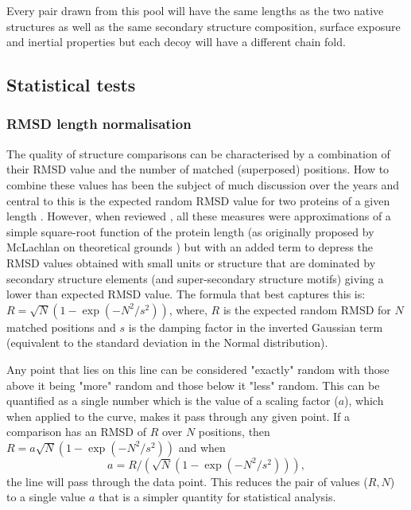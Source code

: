Every pair drawn from this pool will have the same lengths as the two native structures
as well as the same secondary structure composition, surface exposure and inertial properties
but each decoy will have a different chain fold.


\subsection{Statistical tests}

\subsubsection{RMSD length normalisation}

The quality of structure comparisons can be characterised by a combination of their
RMSD value and the number of matched (superposed) positions.  How to combine these values has
been the subject of much discussion over the years and central to this is the expected random
RMSD value for two proteins of a given length \cite{McLachlanAD84,CohenFEet80d,MaiorovVNet94}.   However,
when reviewed \cite{TaylorWR06a}, all these measures were approximations of a simple square-root function of
the protein length (as originally proposed by McLachlan on theoretical grounds \cite{McLachlanAD84})
but with an added term to depress the RMSD values obtained with small units or structure
that are dominated by secondary structure elements (and super-secondary structure motifs) 
giving a lower than expected RMSD value.   The formula that best captures this is:
$R = \surd N (1-\exp(-N^2/s^2))$,
where,
$R$ is the expected random RMSD for $N$ matched positions and $s$ is the damping factor in the inverted
Gaussian term (equivalent to the standard deviation in the Normal distribution).  

Any point that lies on this line can be considered "exactly" random
with those above it being "more" random and those below it "less" random.  This can be quantified
as a single number which is the value of a scaling factor ($a$), which when applied to the curve, makes it
pass through any given point.   If a comparison has an RMSD of $R$ over $N$ positions, then
$R = a\surd N (1-\exp(-N^2/s^2))$ and when
\begin{equation}
\label{Eqn:fit}
a = R/(\surd N (1-\exp(-N^2/s^2))), 
\end{equation}
the line will pass through the data point.  This reduces the pair of values ($R,N$) to a
single value $a$ that is a simpler quantity for statistical analysis.

